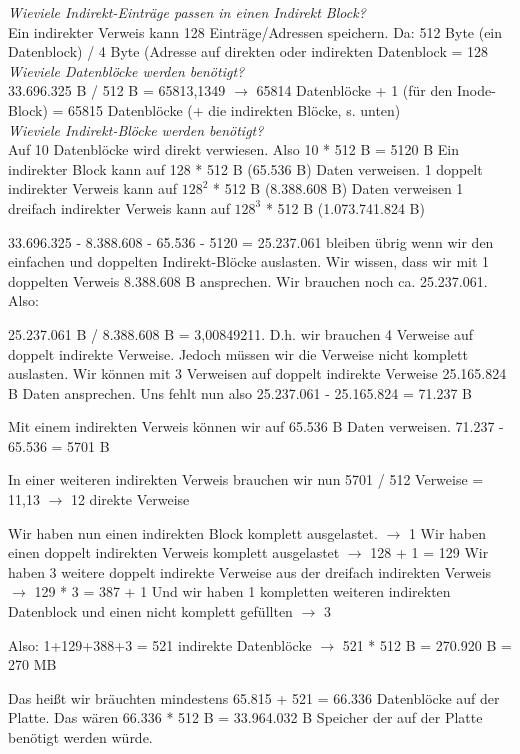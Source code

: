 \documentclass{ti2}
\begin{document}
\textit{Wieviele Indirekt-Einträge passen in einen Indirekt Block?}\\
Ein indirekter Verweis kann 128 Einträge/Adressen speichern. Da: 512 Byte (ein Datenblock) / 4 Byte (Adresse auf direkten oder indirekten Datenblock = 128\\

\textit{Wieviele Datenblöcke werden benötigt?}\\
33.696.325 B / 512 B = 65813,1349 $\rightarrow$ 65814 Datenblöcke + 1 (für den Inode-Block) = 65815 Datenblöcke (+ die indirekten Blöcke, s. unten)\\

\textit{Wieviele Indirekt-Blöcke werden benötigt?}\\
Auf 10 Datenblöcke wird direkt verwiesen. Also 10 * 512 B = 5120 B
Ein indirekter Block kann auf 128 * 512 B (65.536 B) Daten verweisen.
1 doppelt indirekter Verweis kann auf $128^{2}$ * 512 B (8.388.608 B) Daten verweisen
1 dreifach indirekter Verweis kann auf $128^{3}$ * 512 B (1.073.741.824 B)

33.696.325 - 8.388.608 - 65.536 - 5120 = 25.237.061 bleiben übrig wenn wir den einfachen und doppelten Indirekt-Blöcke auslasten.
Wir wissen, dass wir mit 1 doppelten Verweis 8.388.608 B ansprechen. Wir brauchen noch ca. 25.237.061. Also:

25.237.061 B / 8.388.608 B = 3,00849211.  D.h. wir brauchen 4 Verweise auf doppelt indirekte Verweise. Jedoch müssen wir die Verweise nicht komplett auslasten. Wir können mit 3 Verweisen auf doppelt indirekte Verweise 25.165.824 B Daten ansprechen. Uns fehlt nun also 25.237.061 - 25.165.824 = 71.237 B

Mit einem indirekten Verweis können wir auf 65.536 B Daten verweisen. 71.237 - 65.536 = 5701 B

In einer weiteren indirekten Verweis brauchen wir nun 5701 / 512 Verweise = 11,13 $\rightarrow$ 12 direkte Verweise

Wir haben nun einen indirekten Block komplett ausgelastet. $\rightarrow$ 1
Wir haben einen doppelt indirekten Verweis komplett ausgelastet $\rightarrow$ 128 + 1 = 129
Wir haben 3 weitere doppelt indirekte Verweise aus der dreifach indirekten Verweis $\rightarrow$ 129 * 3 = 387 + 1
Und wir haben 1 kompletten weiteren indirekten Datenblock und einen nicht komplett gefüllten $\rightarrow$ 3

Also: 1+129+388+3 = 521 indirekte Datenblöcke 
$\rightarrow$ 521 * 512 B = 270.920 B = 270 MB

Das heißt wir bräuchten mindestens 65.815 + 521 = 66.336 Datenblöcke auf der Platte.
Das wären 66.336 * 512 B = 33.964.032 B Speicher der auf der Platte benötigt werden würde.
\end{document}
